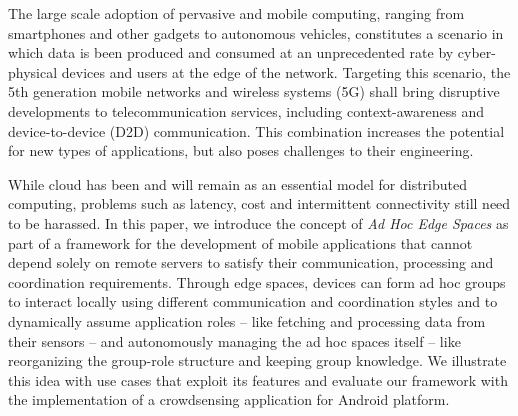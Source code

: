 The large scale adoption of pervasive and mobile computing, ranging from smartphones and other gadgets to autonomous vehicles, constitutes a scenario in which data is been produced and consumed at an unprecedented rate by cyber-physical devices and users at the edge of the network. Targeting this scenario, the 5th generation mobile networks and wireless systems (5G) shall bring disruptive developments to telecommunication services, including context-awareness and device-to-device (D2D) communication. This combination increases the potential for new types of applications, but also poses challenges to their engineering. %

While cloud has been and will remain as an essential model for distributed computing, problems such as latency, cost and intermittent connectivity still need to be harassed. In this paper, we introduce the concept of \textit{Ad Hoc Edge Spaces} as part of a framework for the development of mobile applications that cannot depend solely on remote servers to satisfy their communication, processing and coordination requirements. Through edge spaces, devices can form ad hoc groups to interact locally using different communication and coordination styles and to dynamically assume application roles -- like fetching and processing data from their sensors -- and autonomously managing the ad hoc spaces itself -- like reorganizing the group-role structure and keeping group knowledge. We illustrate this idea with use cases that exploit its features and evaluate our framework with the implementation of a crowdsensing application for Android platform.





